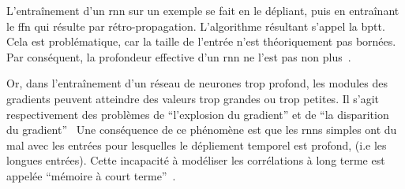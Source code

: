 L'entraînement d'un \gls{rnn} sur un exemple se fait en le dépliant, 
puis en entraînant le \gls{ffn} qui résulte par rétro-propagation.
L'algorithme résultant s'appel la \gls{bptt}.
Cela est problématique, car la taille de l'entrée n'est théoriquement pas bornées.
Par conséquent, la profondeur effective d'un \gls{rnn} ne l'est pas non plus~\cite{Fathi_2021}.

Or, dans l'entraînement d'un réseau de neurones trop profond,
les modules des gradients peuvent atteindre des valeurs trop grandes ou trop petites.
Il s'agit respectivement des problèmes de ``l'explosion du gradient'' 
et de ``la disparition du gradient''~\cite{Basodi_Ji_Zhang_Pan_2020}
Une conséquence de ce phénomène est que 
les \glspl{rnn} simples ont du mal avec les entrées pour lesquelles le dépliement temporel est profond,
(i.e les longues entrées).
Cette incapacité à modéliser les corrélations à long terme est appelée 
``mémoire à court terme''~\cite{Bengio_Simard_Frasconi_1994}.


